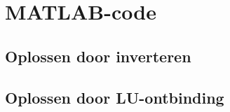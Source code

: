 \documentclass{kulakarticle}
\begin{document}
	\appendix
	\section{MATLAB-code}
	
	\subsection{Oplossen door inverteren}
	\label{code:1}
	
	\subsection{Oplossen door LU-ontbinding}
	\label{code:2}
	
	\label{code:3}
	
\end{document}
